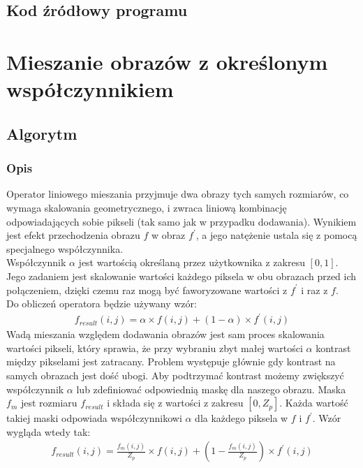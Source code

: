 \documentclass[a4paper,12pt]{book}
\begin{document}
\subsection*{Kod źródłowy programu}

\section{Mieszanie obrazów z określonym współczynnikiem}
\subsection*{Algorytm}
\subsubsection*{Opis}
Operator liniowego mieszania przyjmuje dwa obrazy tych samych rozmiarów, co wymaga skalowania geometrycznego, i zwraca liniową kombinację odpowiadających sobie pikseli (tak samo jak w przypadku dodawania). Wynikiem jest efekt przechodzenia obrazu $f$ w obraz $f^\prime$, a jego natężenie ustala się z pomocą specjalnego współczynnika. \\
Współczynnik $\alpha$ jest wartością określaną przez użytkownika z zakresu $[0,1]$. Jego zadaniem jest skalowanie wartości każdego piksela w obu obrazach przed ich połączeniem, dzięki czemu raz mogą być faworyzowane wartości z $f^\prime$ i raz z $f$. \\
Do obliczeń operatora będzie używany wzór: 
\begin{gather}
	f_{result}(i,j) = \alpha \times f(i,j) + (1 - \alpha) \times f^\prime(i,j)
\end{gather}
Wadą mieszania względem dodawania obrazów jest sam proces skalowania wartości pikseli, który sprawia, że przy wybraniu zbyt małej wartości $\alpha$ kontrast między pikselami jest zatracany. Problem występuje głównie gdy kontrast na samych obrazach jest dość ubogi. Aby podtrzymać kontrast możemy zwiększyć współczynnik $\alpha$ lub zdefiniować odpowiednią maskę dla naszego obrazu. Maska $f_m$ jest rozmiaru $f_{result}$ i składa się z wartości z zakresu $[0, Z_p]$. Każda wartość takiej maski odpowiada współczynnikowi $\alpha$ dla każdego piksela w $f$ i $f^\prime$. Wzór wygląda wtedy tak: 
\begin{gather}
	f_{result}(i,j) = \frac{f_m(i,j)}{Z_p} \times f(i,j) + (1 - \frac{f_m(i,j)}{Z_p}) \times f^\prime(i,j)
\end{gather}
\end{document}
